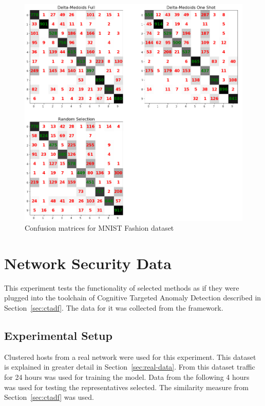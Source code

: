 \documentclass[thesis=B,english]{FITthesis}[2012/10/20]
\begin{document}
\medskip

\begin{figure}[t]
   \includegraphics[width=\linewidth]{img/exp3_mnist_fashion.png}
  \caption{Confusion matrices for MNIST Fashion dataset}
  \label{img:exp4}
\end{figure}

\section{Network Security Data}\label{sec:exp4}

This experiment tests the functionality of selected methods as if they were plugged into the toolchain of Cognitive Targeted Anomaly Detection described in Section~\ref{sec:ctadf}.
The data for it was collected from the framework.

\subsection{Experimental Setup}
Clustered hosts from a real network were used for this experiment.
This dataset is explained in greater detail in Section~\ref{sec:real-data}.
From this dataset traffic for 24 hours was used for training the model.
Data from the following 4 hours was used for testing the representatives selected.
The similarity measure from Section~\ref{sec:ctadf} was used.
\end{document}
